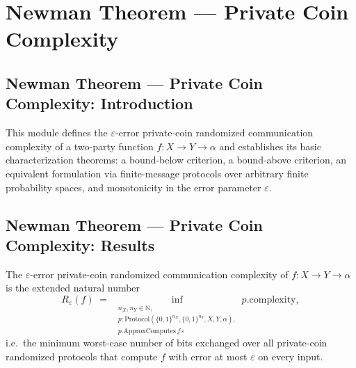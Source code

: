 \section{Newman Theorem --- Private Coin Complexity}
\subsection*{Newman Theorem --- Private Coin Complexity: Introduction}

This module defines the $\varepsilon$-error private-coin randomized communication complexity
of a two-party function $f : X \to Y \to \alpha$ and establishes its basic characterization
theorems: a bound-below criterion, a bound-above criterion, an equivalent formulation via
finite-message protocols over arbitrary finite probability spaces, and monotonicity in the
error parameter $\varepsilon$.

\subsection*{Newman Theorem --- Private Coin Complexity: Results}

\begin{definition}
\label{CommunicationComplexity.PrivateCoin.communicationComplexity}
\leanok
{}
The $\varepsilon$-error private-coin randomized communication complexity of $f : X \to Y \to \alpha$
is the extended natural number
\[
  R_\varepsilon(f)
  \;=\;
  \inf_{\substack{n_X, n_Y \in \mathbb{N},\\ p : \mathrm{Protocol}(\{0,1\}^{n_X}, \{0,1\}^{n_Y}, X, Y, \alpha),\\ p.\mathrm{ApproxComputes}\,f\,\varepsilon}} p.\mathrm{complexity},
\]
i.e.\ the minimum worst-case number of bits exchanged over all private-coin randomized
protocols that compute $f$ with error at most $\varepsilon$ on every input.
\end{definition}

